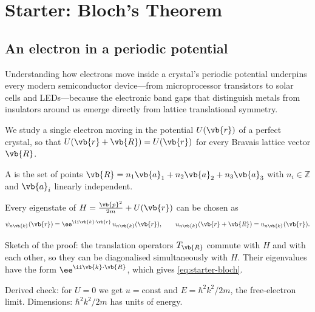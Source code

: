 \chapter{Starter: Bloch's Theorem}
\label{ch:starter}


\section{An electron in a periodic potential}
\label{sec:starter-bloch}

Understanding how electrons move inside a crystal's periodic potential underpins every modern semiconductor device—from microprocessor transistors to solar cells and LEDs—because the electronic band gaps that distinguish metals from insulators around us emerge directly from lattice translational symmetry.

We study a single electron moving in the potential $U(\vb{r})$ of a perfect crystal, so that $U(\vb{r}+\vb{R})=U(\vb{r})$ for every Bravais lattice vector $\vb{R}$.

\begin{definition}\label{def:starter-bravais}
A  is the set of points $\vb{R}=n_1\vb{a}_1+n_2\vb{a}_2+n_3\vb{a}_3$ with $n_i\in\mathbb{Z}$ and $\vb{a}_i$ linearly independent.
\end{definition}

\begin{theorem}[Bloch]\label{thm:starter-bloch}
Every eigenstate of $H=\frac{\vb{p}^2}{2m}+U(\vb{r})$ can be chosen as
\begin{equation}\label{eq:starter-bloch}
  \psi_{n\vb{k}}(\vb{r}) = \ee^{\ii\vb{k}\cdot\vb{r}}\,u_{n\vb{k}}(\vb{r}),\qquad u_{n\vb{k}}(\vb{r}+\vb{R})=u_{n\vb{k}}(\vb{r}).
\end{equation}
\end{theorem}

\begin{supplement}
Sketch of the proof: the translation operators $T_{\vb{R}}$ commute with $H$ and with each other, so they can be diagonalised simultaneously with $H$. Their eigenvalues have the form $\ee^{\ii\vb{k}\cdot\vb{R}}$, which gives \eqref{eq:starter-bloch}.
\end{supplement}

\begin{supplement}
Derived check: for $U=0$ we get $u=\mathrm{const}$ and $E=\hbar^2k^2/2m$, the free-electron limit. Dimensions: $\hbar^2k^2/2m$ has units of energy.
\end{supplement}

